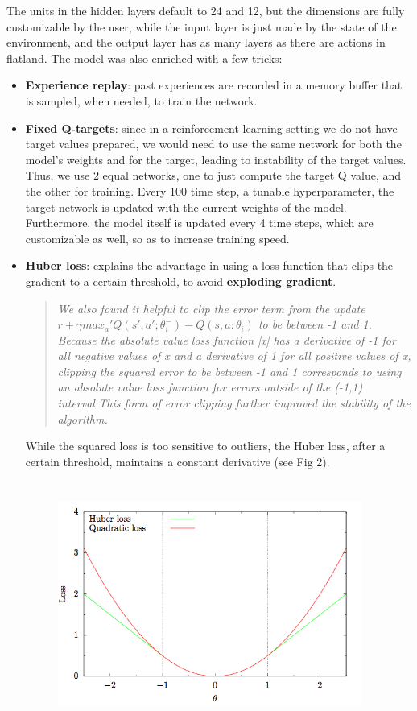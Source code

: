 \noindent 
The units in the hidden layers default to 24 and 12, but the dimensions are fully customizable by the user, while the input layer is just made by the state of the environment, and the output layer has as many layers as there are actions in flatland. The model was also enriched with a few tricks:
\begin{itemize}
\item \textbf{Experience replay}:  past experiences are recorded in a memory buffer that is sampled, when needed, to train the network.
\item \textbf{Fixed Q-targets}: since in a reinforcement learning setting we do not have target values prepared, we would need to use the same network for both the model's weights and for the target, leading to instability of the target values. Thus, we use 2 equal networks, one to just compute the target Q value, and the other for training. Every 100 time step, a tunable hyperparameter, the target network is updated with the current weights of the model. Furthermore, the model itself is updated every 4 time steps, which are customizable as well, so as to increase training speed. 
\item \textbf{Huber loss}: \cite{huber} explains the advantage in using a loss function that clips the gradient to a certain threshold, to avoid \textbf{exploding gradient}.
\begin{quote} 
\centering 
	\textit{We also found it helpful to clip the error term from the update 
	$r + \gamma max_a' Q(s',a'; \theta_i^-) - Q(s,a:\theta_i)$ to be between 
	-1 and 1. Because the absolute value loss function |x| has a derivative of -1
	 for all negative values of x and a derivative of 1 for all positive values of x, 
	 clipping the squared error to be between -1 and 1 corresponds 
	to using an absolute value loss function for errors outside of the (-1,1) 
	interval.This form of error clipping further improved the stability of the algorithm.}
\end{quote}
While the squared loss is too sensitive to outliers, the Huber loss, after a certain threshold, maintains a constant derivative (see Fig 2).
\begin{figure}[H] 
\includegraphics[height=80mm, width=100mm, scale=0.5]{chapters/huber.png}

\end{figure}
\end{itemize}
